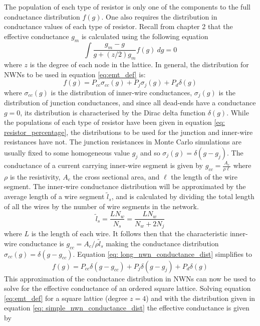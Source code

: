 The population of each type of resistor is only one of the components to the full conductance distribution $f(g)$. One also requires the distribution in conductance values of each type of resistor. Recall from chapter 2 that the effective conductance $g_m$ is calculated using the following equation\cite{kirkpatrick1973} 
\begin{equation}
\int \frac{g_m-g}{g+(z/2)g_m} f(g) ~ dg = 0
\label{eq:emt_def}
\end{equation}
where $z$ is the degree of each node in the lattice. In general, the distribution for NWNs to be used in equation \ref{eq:emt_def} is:
\begin{equation}
f(g) = P_{cc} \sigma_{cc}(g) + P_j \sigma_{j}(g) + P_d \delta(g) 
\label{eq: long_nwn_conductance_dist}
\end{equation}
where $\sigma_{cc}(g)$ is the distribution of inner-wire conductances, $\sigma_{j}(g)$ is the distribution of junction conductances, and since all dead-ends have a conductance $g=0$, its distribution is characterised by the Dirac delta function $\delta(g)$. While the populations of each type of resistor have been given in equation \ref{eq: resistor_percentage}, the distributions to be used for the junction and inner-wire resistances have not. The junction resistances in Monte Carlo simulations are usually fixed to some homogeneous value $g_j$ and so $\sigma_{j}(g) = \delta(g-g_j)$. The conductance of a current carrying inner-wire segment is given by $g_{cc} = \frac{A_c}{\rho \ell}$ where $\rho$ is the resistivity, $A_c$ the cross sectional area, and $\ell$ the length of the wire segment. The inner-wire conductance distribution will be approximated by the average length of a wire segment $\tilde{l}_s$, and is calculated by dividing the total length of all the wires by the number of wire segments in the network. 
\begin{equation}
\tilde{l}_s= \frac{L N_w}{N_s} = \frac{L N_w}{N_w + 2 N_j}
\end{equation}
where $L$ is the length of each wire. It follows then that the characteristic inner-wire conductance is $g_{cc} = A_c/\rho \tilde{l}_s$ making the conductance distribution $\sigma_{cc}(g) = \delta(g - g_{cc})$. Equation \ref{eq: long_nwn_conductance_dist} simplifies to
\begin{equation}
f(g) = P_{cc} \delta(g - g_{cc}) + P_j \delta(g - g_j) + P_d \delta(g)
\label{eq: simple_nwn_conductance_dist}
\end{equation}
This approximation of the conductance distribution in NWNs can now be used to solve for the effective conductance of an ordered square lattice. Solving equation \ref{eq:emt_def} for a square lattice (degree $z = 4$) and with the distribution given in equation \ref{eq: simple_nwn_conductance_dist} the effective conductance is given by\cite{ocallaco2016}
